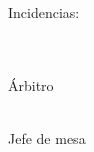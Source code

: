 {	\normalsize\vspace{0.3cm}
	\noindent Incidencias: \\[8pt]
	\linea{\linewidth}\\[8pt]
	\linea{\linewidth}

	\vfill
	\noindent\begin{minipage}{0.45\linewidth}\centering\linea{5cm}\\ Árbitro\end{minipage}\hfill
	\begin{minipage}{0.45\linewidth}\centering\linea{5cm}\\ Jefe de mesa\end{minipage}
	\clearpage
}




